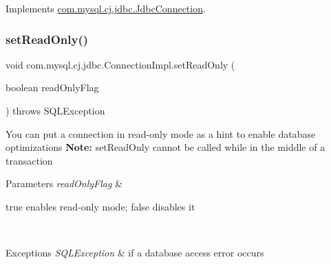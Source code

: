 Implements \mbox{\hyperlink{interfacecom_1_1mysql_1_1cj_1_1jdbc_1_1_jdbc_connection_a48162c9f0bf249804ae60cb7404cd0f8}{com.\+mysql.\+cj.\+jdbc.\+Jdbc\+Connection}}.

\mbox{\label{classcom_1_1mysql_1_1cj_1_1jdbc_1_1_connection_impl_a52d1622cdb325e2780cd5f224afc09e0}} 
\subsubsection{\texorpdfstring{set\+Read\+Only()}{setReadOnly()}}
{\footnotesize\ttfamily void com.\+mysql.\+cj.\+jdbc.\+Connection\+Impl.\+set\+Read\+Only (\begin{DoxyParamCaption}\item[{boolean}]{read\+Only\+Flag }\end{DoxyParamCaption}) throws S\+Q\+L\+Exception}

You can put a connection in read-\/only mode as a hint to enable database optimizations {\bfseries Note\+:} set\+Read\+Only cannot be called while in the middle of a transaction


\begin{DoxyParams}{Parameters}
{\em read\+Only\+Flag} & 
\begin{DoxyItemize}
\item true enables read-\/only mode; false disables it 
\end{DoxyItemize}\\
\hline
\end{DoxyParams}

\begin{DoxyExceptions}{Exceptions}
{\em S\+Q\+L\+Exception} & if a database access error occurs \\
\hline
\end{DoxyExceptions}
\mbox{\label{classcom_1_1mysql_1_1cj_1_1jdbc_1_1_connection_impl_a1926df8f86ddb350d61ce032e248a1ba}} 
